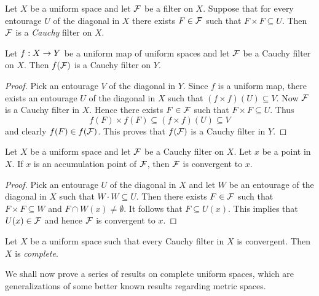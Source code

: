 \documentclass[10pt]{amsart}
\begin{document}
\begin{definition}
	Let $X$ be a uniform space and let ${\mathcal F}$ be a filter on $X$. Suppose that for every entourage $U$ of the diagonal in $X$ there exists $F \in {\mathcal F}$ such that $F\times F \subseteq U$. Then ${\mathcal F}$ is a \textit{Cauchy} filter on $X$.
\end{definition}

\begin{fact}\label{fact:Cauchy_filters_are_preserved_by_uniform_maps}
	Let $f:X\rightarrow Y$ be a uniform map of uniform spaces and let ${\mathcal F}$ be a Cauchy filter on $X$. Then $f({\mathcal F})$ is a Cauchy filter on $Y$.
\end{fact}
\begin{proof}
	Pick an entourage $V$ of the diagonal in $Y$. Since $f$ is a uniform map, there exists an entourage $U$ of the diagonal in $X$ such that $\left(f\times f\right)(U) \subseteq V$. Now ${\mathcal F}$ is a Cauchy filter in $X$. Hence there exists $F \in {\mathcal F}$ such that $F\times F \subseteq U$. Thus
	$$f(F)\times f(F) \subseteq \left(f\times f\right)(U) \subseteq V$$
	and clearly $f(F) \in f({\mathcal F})$. This proves that $f({\mathcal F})$ is a Cauchy filter in $Y$.
\end{proof}

\begin{fact}\label{fact:Cauchy_filter_with_accumultation_point_is_convergent}
	Let $X$ be a uniform space and let ${\mathcal F}$ be a Cauchy filter on $X$. Let $x$ be a point in $X$. If $x$ is an accumulation point of ${\mathcal F}$, then ${\mathcal F}$ is convergent to $x$.
\end{fact}
\begin{proof}
	Pick an entourage $U$ of the diagonal in $X$ and let $W$ be an entourage of the diagonal in $X$ such that $W\cdot W \subseteq U$. Then there exists $F \in {\mathcal F}$ such that $F\times F \subseteq W$ and $F\cap W(x)\neq \emptyset$. It follows that $F\subseteq U(x)$. This implies that $U(x) \in {\mathcal F}$ and hence ${\mathcal F}$ is convergent to $x$.
\end{proof}

\begin{definition}
	Let $X$ be a uniform space such that every Cauchy filter in $X$ is convergent. Then $X$ is \textit{complete}.
\end{definition}
\noindent
We shall now prove a series of results on complete uniform spaces, which are generalizations of some better known results regarding metric spaces.
\end{document}
